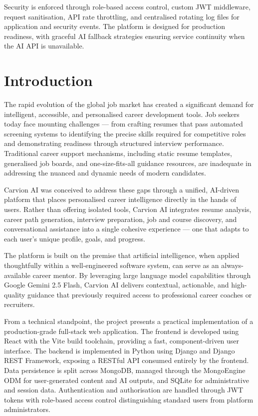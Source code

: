 \documentclass[12pt]{article}
\begin{document}
Security is enforced through role-based access control, custom JWT middleware, request sanitisation, API rate throttling, and centralised rotating log files for application and security events. The platform is designed for production readiness, with graceful AI fallback strategies ensuring service continuity when the AI API is unavailable.

\clearpage
\section{Introduction}

The rapid evolution of the global job market has created a significant demand for intelligent, accessible, and personalised career development tools. Job seekers today face mounting challenges --- from crafting resumes that pass automated screening systems to identifying the precise skills required for competitive roles and demonstrating readiness through structured interview performance. Traditional career support mechanisms, including static resume templates, generalised job boards, and one-size-fits-all guidance resources, are inadequate in addressing the nuanced and dynamic needs of modern candidates.

Carvion AI was conceived to address these gaps through a unified, AI-driven platform that places personalised career intelligence directly in the hands of users. Rather than offering isolated tools, Carvion AI integrates resume analysis, career path generation, interview preparation, job and course discovery, and conversational assistance into a single cohesive experience --- one that adapts to each user's unique profile, goals, and progress.

The platform is built on the premise that artificial intelligence, when applied thoughtfully within a well-engineered software system, can serve as an always-available career mentor. By leveraging large language model capabilities through Google Gemini 2.5 Flash, Carvion AI delivers contextual, actionable, and high-quality guidance that previously required access to professional career coaches or recruiters.

From a technical standpoint, the project presents a practical implementation of a production-grade full-stack web application. The frontend is developed using React with the Vite build toolchain, providing a fast, component-driven user interface. The backend is implemented in Python using Django and Django REST Framework, exposing a RESTful API consumed entirely by the frontend. Data persistence is split across MongoDB, managed through the MongoEngine ODM for user-generated content and AI outputs, and SQLite for administrative and session data. Authentication and authorisation are handled through JWT tokens with role-based access control distinguishing standard users from platform administrators.
\end{document}
